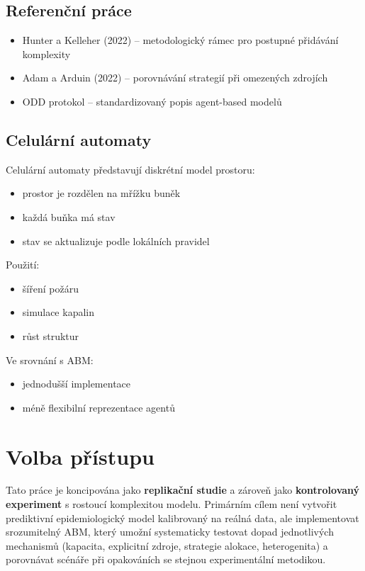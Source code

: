 \documentclass{article}
\begin{document}
\subsection{Referenční práce}
\begin{itemize}
\item Hunter a Kelleher (2022) -- metodologický rámec pro postupné přidávání komplexity
\item Adam a Arduin (2022) -- porovnávání strategií při omezených zdrojích
\item ODD protokol -- standardizovaný popis agent-based modelů
\end{itemize}

\subsection{Celulární automaty}

Celulární automaty představují diskrétní model prostoru:

\begin{itemize}
\item prostor je rozdělen na mřížku buněk
\item každá buňka má stav
\item stav se aktualizuje podle lokálních pravidel
\end{itemize}

Použití:
\begin{itemize}
\item šíření požáru
\item simulace kapalin
\item růst struktur
\end{itemize}

Ve srovnání s ABM:
\begin{itemize}
\item jednodušší implementace
\item méně flexibilní reprezentace agentů
\end{itemize}

\section{Volba přístupu}

Tato práce je koncipována jako \textbf{replikační studie} a zároveň jako \textbf{kontrolovaný experiment} s rostoucí komplexitou modelu. Primárním cílem není vytvořit prediktivní epidemiologický model kalibrovaný na reálná data, ale implementovat srozumitelný ABM, který umožní systematicky testovat dopad jednotlivých mechanismů (kapacita, explicitní zdroje, strategie alokace, heterogenita) a porovnávat scénáře při opakováních se stejnou experimentální metodikou.
\end{document}
